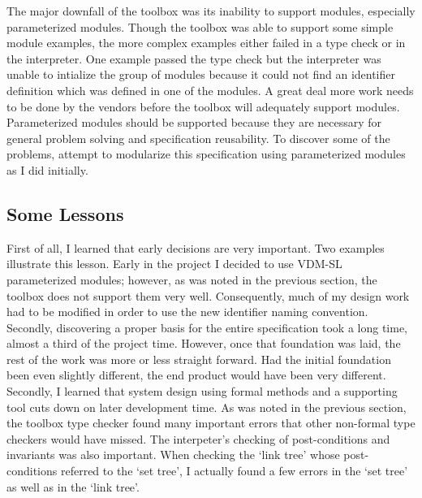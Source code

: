\documentclass[11pt]{article}
\begin{document}
The major downfall of the toolbox was its inability to support modules, especially parameterized modules.  Though the toolbox was able to support some simple module examples, the more complex examples either failed in a type check or in the interpreter.  One example passed the type check but the interpreter was unable to intialize the group of modules because it could not find an identifier definition which was defined in one of the modules.  A great deal more work needs to be done by the vendors before the toolbox will adequately support modules.  Parameterized modules should be supported because they are necessary for general problem solving and specification reusability.  To discover some of the problems, attempt to modularize this specification using parameterized modules as I did initially.   

\subsection{Some Lessons}
First of all, I learned that early decisions are very important.  Two examples illustrate this lesson.  Early in the project I decided to use VDM-SL parameterized modules; however, as was noted in the previous section, the toolbox does not support them very well.  Consequently, much of my design work had to be modified in order to use the new identifier naming convention.  Secondly, discovering a proper basis for the entire specification took a long time, almost a third of the project time.  However, once that foundation was laid, the rest of the work was more or less straight forward.  Had the initial foundation been even slightly different, the end product would have been very different. \\

Secondly, I learned that system design using formal methods and a supporting tool cuts down on later development time.  As was noted in the previous section, the toolbox type checker found many important errors that other non-formal type checkers would have missed.  The interpeter's checking of post-conditions and invariants was also important.  When checking the `link tree' whose post-conditions referred to the `set tree', I actually found a few errors in the `set tree' as well as in the `link tree'.    
\end{document}
